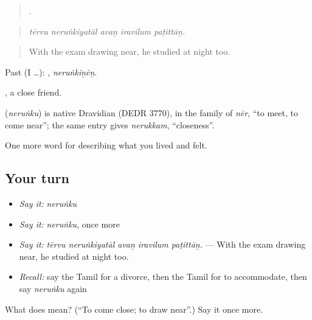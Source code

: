 \begin{quote}
    .
\end{quote}

\begin{quote}
\emph{tērvu neruṅkiyatāl avaṉ iravilum paṭittāṉ.}
\end{quote}

\begin{quote}
With the exam drawing near, he studied at night too.
\end{quote}

Past (I …): , \emph{neruṅkiṉēṉ}.

 , a close friend.

\begin{cousinweb}
\textbf{} (\emph{neruṅku}) is native Dravidian (DEDR 3770), in the family of  \emph{nēr}, \textquotedblleft{}to meet, to come near\textquotedblright{}; the same entry gives  \emph{nerukkam}, \textquotedblleft{}closeness\textquotedblright{}.
\end{cousinweb}

\begin{grammarlens}[title={What you've built}]
One more word for describing what you lived and felt.
\end{grammarlens}

\subsection*{Your turn}
\begin{itemize}
\raggedright
  \item \emph{Say it:} \emph{neruṅku}
  \item \emph{Say it:} \emph{neruṅku}, once more
  \item \emph{Say it:} \emph{tērvu neruṅkiyatāl avaṉ iravilum paṭittāṉ.} — With the exam drawing near, he studied at night too.
  \item \emph{Recall:} say the Tamil for a divorce, then the Tamil for to accommodate, then say \emph{neruṅku} again
\end{itemize}

\begin{tcolorbox}[breakable,colback=teal!4,colframe=teal!35!black,title={Before you move on}]
What does  mean? (\textquotedblleft{}To come close; to draw near\textquotedblright{}.) Say it once more.
\end{tcolorbox}
